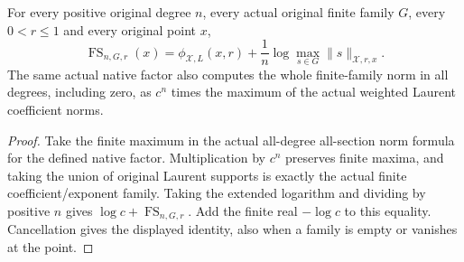\begin{theorem}\label{thm:native-tc-original-potential-weighted-fs}
\leanok
For every positive original degree $n$, every actual original finite
family $G$, every $0<r\leq1$ and every original point $x$,
\[
 \operatorname{FS}_{n,G,r}(x)=\phi_{\mathcal X,L}(x,r)
 +\frac1n\log\max_{s\in G}\lVert s\rVert_{\mathcal X,r,x}.
\]
The same actual native factor also computes the whole finite-family
norm in all degrees, including zero, as $c^n$ times the maximum of
the actual weighted Laurent coefficient norms.
\end{theorem}
\begin{proof}
Take the finite maximum in the actual all-degree all-section norm
formula for the defined native factor. Multiplication by $c^n$
preserves finite maxima, and taking the union of original Laurent
supports is exactly the actual finite coefficient/exponent family.
Taking the extended logarithm and dividing by positive $n$ gives
$\log c+\operatorname{FS}_{n,G,r}$. Add the finite real $-\log c$
to this equality. Cancellation gives the displayed identity, also
when a family is empty or vanishes at the point.
\end{proof}

